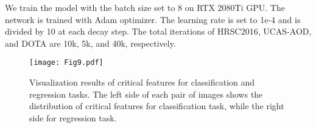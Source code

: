 \documentclass[journal]{IEEEtran}
\begin{document}
We train the model with the batch size set to 8 on RTX 2080Ti GPU.  The network is trained with Adam optimizer. The learning rate is set to 1e-4 and  is divided by 10 at each decay step. The total iterations of HRSC2016, UCAS-AOD, and DOTA are 10k, 5k, and 40k, respectively. 



\begin{table}[t]
	\renewcommand\arraystretch{1.1}
	\centering
	\caption{Effects of each component of CFC-Net.}

	\label{Table1}
\end{table}	


\begin{table}[t]
	\renewcommand\arraystretch{1.1}
	\centering
	\caption{Ablation study of the proposed PAM.}
	\label{Table2}
\end{table}	


\begin{figure}[t]
	\centering
	\texttt{[image: Fig9.pdf]} 
	\caption{Visualization results of critical features for classification and regression tasks. The left side of each pair of images shows the distribution of critical features for classification task, while the right side for regression task.}
	\label{Fig9}
\end{figure}
\end{document}
